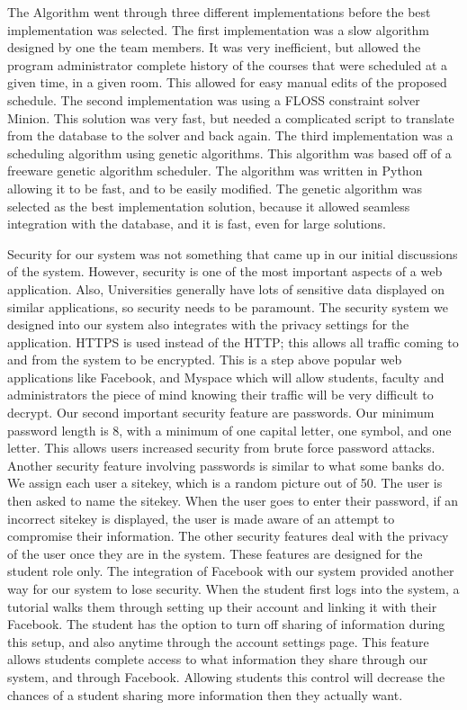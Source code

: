\documentclass[12pt,article]{memoir}
\begin{document}
The Algorithm went through three different implementations before the best implementation was selected. The first implementation was a slow algorithm designed by one the team members. It was very inefficient, but allowed the program administrator complete history of the courses that were scheduled at a given time, in a given room. This allowed for easy manual edits of the proposed schedule. The second implementation was using a FLOSS constraint solver Minion. This solution was very fast, but needed a complicated script to translate from the database to the solver and back again. The third implementation was a scheduling algorithm using genetic algorithms. This algorithm was based off of a freeware genetic algorithm scheduler. The algorithm was written in Python allowing it to be fast, and to be easily modified. The genetic algorithm was selected as the best implementation solution, because it allowed seamless integration with the database, and it is fast, even for large solutions.

Security for our system was not something that came up in our initial discussions of the system. However, security is one of the most important aspects of a web application. Also, Universities generally have lots of sensitive data displayed on similar applications, so security needs to be paramount. The security system we designed into our system also integrates with the privacy settings for the application. HTTPS is used instead of the HTTP; this allows all traffic coming to and from the system to be encrypted. This is a step above popular web applications like Facebook, and Myspace which will allow students, faculty and administrators the piece of mind knowing their traffic will be very difficult to decrypt. Our second important security feature are passwords. Our minimum password length is 8, with a minimum of one capital letter, one symbol, and one letter. This allows users increased security from brute force password attacks. Another security feature involving passwords is similar to what some banks do. We assign each user a sitekey, which is a random picture out of 50. The user is then asked to name the sitekey. When the user goes to enter their password, if an incorrect sitekey is displayed, the user is made aware of an attempt to compromise their information. 
The other security features deal with the privacy of the user once they are in the system. These features are designed for the student role only. The integration of Facebook with our system provided another way for our system to lose security. When the student first logs into the system, a tutorial walks them through setting up their account and linking it with their Facebook. The student has the option to turn off sharing of information during this setup, and also anytime through the account settings page. This feature allows students complete access to what information they share through our system, and through Facebook. Allowing students this control will decrease the chances of a student sharing more information then they actually want.
\end{document}
